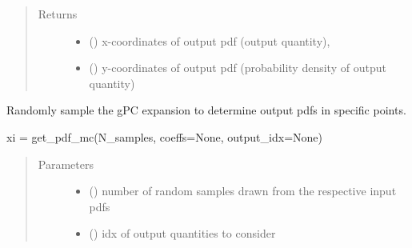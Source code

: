 \documentclass[letterpaper,10pt,english,openany,oneside]{sphinxmanual}
\begin{document}
\begin{fulllineitems}
\begin{fulllineitems}
\begin{quote}
\begin{description}
\begin{itemize}
\end{itemize}

\item[{Returns}] \leavevmode
\begin{itemize}
\item {} 
 () \textendash{} x-coordinates of output pdf (output quantity),

\item {} 
 () \textendash{} y-coordinates of output pdf (probability density of output quantity)

\end{itemize}


\end{description}\end{quote}

\end{fulllineitems}


\begin{fulllineitems}
\label{\detokenize{pygpc:pygpc.gpc.gPC.get_pdf_monte_carlo}}
Randomly sample the gPC expansion to determine output pdfs in specific points.

xi = get\_pdf\_mc(N\_samples, coeffs=None, output\_idx=None)
\begin{quote}\begin{description}
\item[{Parameters}] \leavevmode\begin{itemize}
\item {} 
 () \textendash{} number of random samples drawn from the respective input pdfs

\item {} 
 (\sphinxstyleliteralemphasis{\sphinxupquote{{[}}}\sphinxstyleliteralemphasis{\sphinxupquote{{]} }}\sphinxstyleliteralemphasis{\sphinxupquote{, }}\sphinxstyleliteralemphasis{\sphinxupquote{, }}) \textendash{} idx of output quantities to consider


\end{itemize}
\end{description}
\end{quote}
\end{fulllineitems}
\end{fulllineitems}
\end{document}
